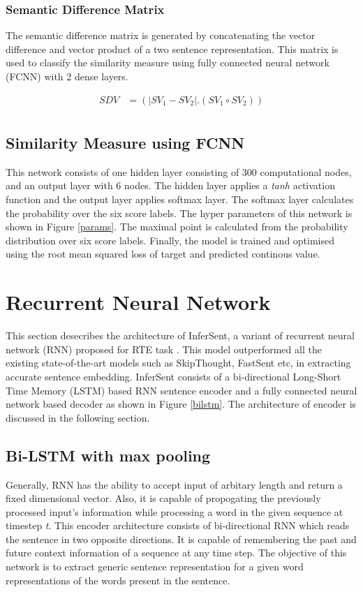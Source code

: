 \documentclass[12pt]{report} %
\begin{document}
	
	\subsubsection*{Semantic Difference Matrix}
	The semantic difference matrix is generated by concatenating the vector difference and vector product of a two sentence representation. This matrix is used to classify the similarity measure using fully connected neural network (FCNN) with 2 dense layers. 
	
		\begin{align*} 
			SDV & =(|SV_{1}- SV_{2}|.(SV_{1} \circ SV_{2})) \\
		\end{align*}
	
	\subsection{Similarity Measure using FCNN}
	
	 This network consists of one hidden layer consisting of 300 computational nodes, and an output layer with 6 nodes. The hidden layer applies a \textit{tanh} activation function and the output layer applies softmax layer. The softmax layer calculates the probability over the six score labels. The hyper parameters of this network is shown in Figure \ref{params}.
	 The maximal point is calculated from the probability distribution over six score labels. Finally, the model is trained and optimised using the root mean squared loss of target and predicted continous value. 
	 
	 \section{Recurrent Neural Network}
	 This section desecribes the architecture of InferSent, a variant of recurrent neural network (RNN) proposed for RTE task \citep{conneau2017supervised}. This model outperformed all the existing state-of-the-art models such as SkipThought, FastSent etc, in extracting accurate sentence embedding. InferSent consists of a bi-directional Long-Short Time Memory (LSTM) based RNN sentence encoder and a fully connected neural network based decoder as shown in Figure \ref{bilstm}. The architecture of encoder is discussed in the following section. 
	 
	\subsection{Bi-LSTM with max pooling}
	Generally, RNN has the ability to accept input of arbitary length and return a fixed dimensional vector. Also, it is capable of propogating the previously processed input's information while processing a word in the given sequence at timestep \textit{t}.
	This encoder architecture consists of bi-directional RNN which reads the sentence in two opposite directions. It is capable of remembering the past and future context information of a sequence at any time step. The objective of this network is to extract generic sentence representation for a given word representations of the words present in the sentence.  
	
\end{document}
